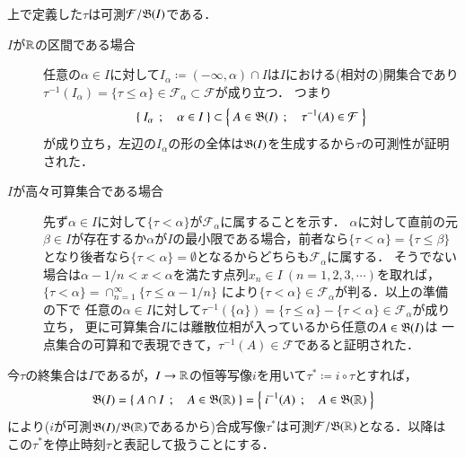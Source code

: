 	\begin{itembox}[l]{}
		\begin{rem}[停止時刻は可測]
			上で定義した$\tau$は可測$\mathcal{F}/\mathfrak{B}(I)$である．
		\end{rem}
	\end{itembox}
	\begin{prf}\mbox{}
		\begin{description}
			\item[$I$が$\mathbb{R}$の区間である場合]
				任意の$\alpha \in I$に対して$I_\alpha \coloneqq (-\infty,\alpha) \cap I$は$I$における(相対の)開集合であり
				$\tau^{-1}(I_\alpha) = \{ \tau \leq \alpha \} \in \mathcal{F}_\alpha \subset \mathcal{F}$が成り立つ．
				つまり
				\begin{align}
					\left\{\ I_\alpha\ \, ; \quad \alpha \in I\ \right\} \subset \left\{\ A \in \mathfrak{B}(I)\ \, ; \quad \tau^{-1}(A) \in \mathcal{F}\ \right\}
					\label{eq:stopping_time_mble}
				\end{align}
				が成り立ち，左辺の$I_\alpha$の形の全体は$\mathfrak{B}(I)$を生成するから$\tau$の可測性が証明された．
				
			\item[$I$が高々可算集合である場合]
				先ず$\alpha \in I$に対して$\{ \tau < \alpha \}$が$\mathcal{F}_\alpha$に属することを示す．
				$\alpha$に対して直前の元$\beta \in I$が存在するか$\alpha$が$I$の最小限である場合，前者なら$\{ \tau < \alpha \} = \{ \tau \leq \beta \}$
				となり後者なら$\{ \tau < \alpha \} = \emptyset$となるからどちらも$\mathcal{F}_\alpha$に属する．
				そうでない場合は$\alpha - 1/n < x < \alpha$を満たす点列$x_n \in I\ (n=1,2,3,\cdots)$を取れば，
				$\{ \tau < \alpha \} = \cap_{n=1}^{\infty}\{ \tau \leq \alpha - 1/n \}$
				により$\{ \tau < \alpha \} \in \mathcal{F}_\alpha$が判る．以上の準備の下で
				任意の$\alpha \in I$に対して$\tau^{-1}(\{\alpha\}) = \{ \tau \leq \alpha \} - \{ \tau < \alpha \} \in \mathcal{F}_\alpha$が成り立ち，
				更に可算集合$I$には離散位相が入っているから任意の$A \in \mathfrak{B}(I)$は
				一点集合の可算和で表現できて，$\tau^{-1}(A) \in \mathcal{F}$であると証明された．		
		\end{description}
		\QED
	\end{prf}
	
	\begin{itembox}[l]{}
		\begin{dfn}[停止時刻の再定義]
			今$\tau$の終集合は$I$であるが，$I \rightarrow \mathbb{R}$の恒等写像$i$を用いて$\tau^* \coloneqq i \circ \tau$とすれば，
			\begin{align}
				\mathfrak{B}(I)=\left\{\ A \cap I\ \, ; \quad A \in \mathfrak{B}(\mathbb{R})\ \right\} = \left\{\ i^{-1}(A)\ \, ; \quad A \in \mathfrak{B}(\mathbb{R})\ \right\}
			\end{align}
			により($i$が可測$\mathfrak{B}(I)/\mathfrak{B}(\mathbb{R})$であるから)合成写像$\tau^*$は可測$\mathcal{F}/\mathfrak{B}(\mathbb{R})$となる．以降は
			この$\tau^*$を停止時刻$\tau$と表記して扱うことにする．
		\end{dfn}
	\end{itembox}
	

